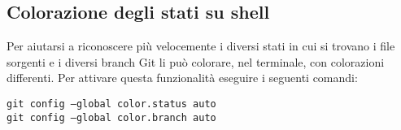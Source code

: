 \subsection{Colorazione degli stati su shell}
Per aiutarsi a riconoscere più velocemente i diversi stati in cui si trovano i file sorgenti e i diversi branch Git li può colorare, nel terminale, con colorazioni differenti. Per attivare questa funzionalità eseguire i seguenti comandi:

\begin{center}
\texttt{git config --global color.status auto}\\
\texttt{git config --global color.branch auto}
\end{center}
